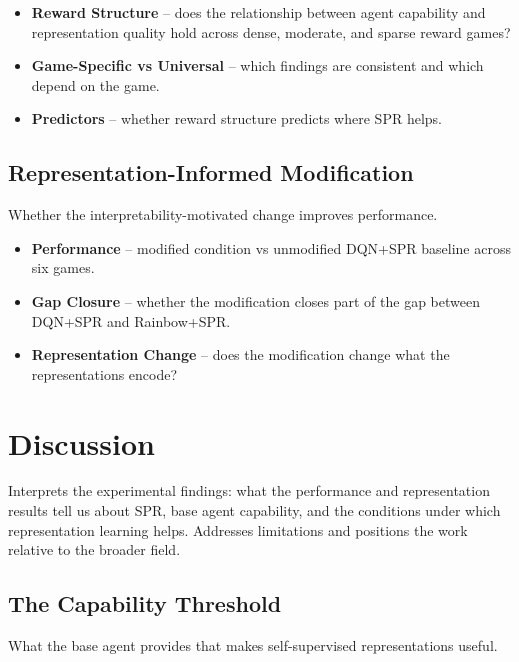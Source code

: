 \documentclass[11pt]{article}
\begin{document}
\begin{itemize}
\item \textbf{Reward Structure} -- does the relationship between
  agent capability and representation quality hold across dense,
  moderate, and sparse reward games?
\item \textbf{Game-Specific vs Universal} -- which findings are
  consistent and which depend on the game.
\item \textbf{Predictors} -- whether reward structure predicts
  where SPR helps.
\end{itemize}

\subsection{Representation-Informed Modification}

\noindent Whether the interpretability-motivated change improves
performance.

\begin{itemize}
\item \textbf{Performance} -- modified condition vs unmodified
  DQN+SPR baseline across six games.
\item \textbf{Gap Closure} -- whether the modification closes
  part of the gap between DQN+SPR and Rainbow+SPR.
\item \textbf{Representation Change} -- does the modification
  change what the representations encode?
\end{itemize}


\section{Discussion}

\noindent Interprets the experimental findings: what the performance
and representation results tell us about SPR, base agent capability,
and the conditions under which representation learning helps. Addresses
limitations and positions the work relative to the broader field.

\subsection{The Capability Threshold}

\noindent What the base agent provides that makes self-supervised
representations useful.
\end{document}
